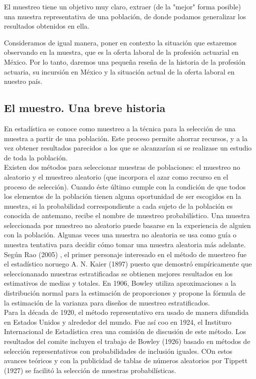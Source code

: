 \documentclass[a4paper]{article}
\begin{document}
El muestreo tiene un objetivo muy claro, extraer (de la "mejor" forma posible) una muestra representativa de una población, de donde podamos generalizar los resultados obtenidos en ella. \cite{lohr}

Consideramos de igual manera, poner en contexto la situación que estaremos observando en la muestra, que es la oferta laboral de la profesión actuarial en México. Por lo tanto, daremos una pequeña reseña de la historia de la profesión actuaria, su incursión en México y la situación actual de la oferta laboral en nuestro país.

\subsection{El muestro. Una breve historia}
En estadística se conoce como muestreo a la técnica para la selección de una muestra a partir de una población. Este proceso permite ahorrar recursos, y a la vez obtener resultados parecidos a los que se alcanzarían si se realizase un estudio de toda la población.\\

Existen dos métodos para seleccionar muestras de poblaciones: el muestreo no aleatorio y el muestreo aleatorio (que incorpora el azar como recurso en el proceso de selección). Cuando éste último cumple con la condición de que todos los elementos de la población tienen alguna oportunidad de ser escogidos en la muestra, si la probabilidad correspondiente a cada sujeto de la población es conocida de antemano, recibe el nombre de muestreo probabilístico. 
Una muestra seleccionada por muestreo no aleatorio puede basarse en la experiencia de alguien con la población. Algunas veces una muestra no aleatoria se usa como guía o muestra tentativa para decidir cómo tomar una muestra aleatoria más adelante.\cite{wiki}\\

Según Rao (2005) \cite{rao}, el primer personaje interesado en el método de muestreo fue el estadístico noruego A. N. Kaier (1897) puesto que demostró empíricamente que seleccionanado muestras estratificadas se obtienen mejores resultados en los estimativos de medias y totales. En 1906, Bowley utiliza aproximaciones a la distribución normal para la estimación de proporciones y propone la fórmula de la estimación de la varianza para diseños de muestreo estratificados.\\

Para la década de 1920, el método representativo era usado de manera difundida en Estados Unidos y alrededor del mundo. Fue así coo en 1924, el Instituro Internacional de Estadística crea una comisión de discusión de este método. Los resultados del comite incluyen el trabajo de Bowley (1926) basado en métodos de selección representativos con probabilidades de inclusión iguales. COn estos avances teóricos y con la publicidad de tablas de números aleatorios por Tippett (1927) se facilitó la selección de muestras probabilísticas.
\end{document}
